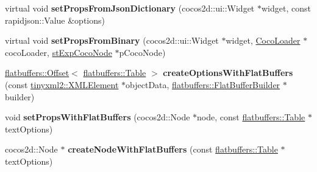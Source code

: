 \begin{DoxyCompactItemize}
virtual void {\bfseries set\+Props\+From\+Json\+Dictionary} (cocos2d\+::ui\+::\+Widget $\ast$widget, const rapidjson\+::\+Value \&options)
\item 
\mbox{\label{classcocostudio_1_1TextReader_a9d5eb98c03c225df04cd09e324b5fb66}} 
virtual void {\bfseries set\+Props\+From\+Binary} (cocos2d\+::ui\+::\+Widget $\ast$widget, \hyperlink{classcocostudio_1_1CocoLoader}{Coco\+Loader} $\ast$coco\+Loader, \hyperlink{structcocostudio_1_1stExpCocoNode}{st\+Exp\+Coco\+Node} $\ast$p\+Coco\+Node)
\item 
\mbox{\label{classcocostudio_1_1TextReader_a00b1ac09abad34949f3e6c57123e6c52}} 
\hyperlink{structflatbuffers_1_1Offset}{flatbuffers\+::\+Offset}$<$ \hyperlink{classflatbuffers_1_1Table}{flatbuffers\+::\+Table} $>$ {\bfseries create\+Options\+With\+Flat\+Buffers} (const \hyperlink{classtinyxml2_1_1XMLElement}{tinyxml2\+::\+X\+M\+L\+Element} $\ast$object\+Data, \hyperlink{classflatbuffers_1_1FlatBufferBuilder}{flatbuffers\+::\+Flat\+Buffer\+Builder} $\ast$builder)
\item 
\mbox{\label{classcocostudio_1_1TextReader_a1f45bfdfa6d0f9676841579b444a998b}} 
void {\bfseries set\+Props\+With\+Flat\+Buffers} (cocos2d\+::\+Node $\ast$node, const \hyperlink{classflatbuffers_1_1Table}{flatbuffers\+::\+Table} $\ast$text\+Options)
\item 
\mbox{\label{classcocostudio_1_1TextReader_ab63f2b3fbd9a122c772d3dc399bbf74e}} 
cocos2d\+::\+Node $\ast$ {\bfseries create\+Node\+With\+Flat\+Buffers} (const \hyperlink{classflatbuffers_1_1Table}{flatbuffers\+::\+Table} $\ast$text\+Options)
\end{DoxyCompactItemize}
